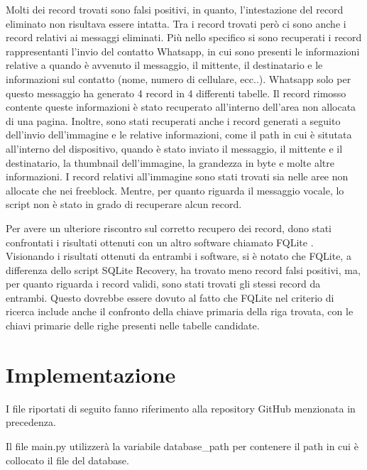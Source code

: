 Molti dei record trovati sono falsi positivi, in quanto, l'intestazione del record eliminato non risultava essere intatta. Tra i record trovati però ci sono anche i record relativi ai messaggi eliminati.
Più nello specifico si sono recuperati i record rappresentanti l'invio del contatto Whatsapp, in cui sono presenti le informazioni relative a quando è avvenuto il messaggio, il mittente, il destinatario e le informazioni sul contatto (nome, numero di cellulare, ecc..).
Whatsapp solo per questo messaggio ha generato 4 record in 4 differenti tabelle.
Il record rimosso contente queste informazioni è stato recuperato all'interno dell'area non allocata di una pagina.
Inoltre, sono stati recuperati anche i record generati a seguito dell'invio dell'immagine e le relative informazioni, come il path in cui è situtata all'interno del dispositivo, quando è stato inviato il messaggio, il mittente e il destinatario, la thumbnail dell'immagine, la grandezza in byte e molte altre informazioni.
I record relativi all'immagine sono stati trovati sia nelle aree non allocate che nei freeblock.
Mentre, per quanto riguarda il messaggio vocale, lo script non è stato in grado di recuperare alcun record.

Per avere un ulteriore riscontro sul corretto recupero dei record, dono stati confrontati i risultati ottenuti con un altro software chiamato FQLite \cite{fqlite}.
Visionando i risultati ottenuti da entrambi i software, si è notato che FQLite, a differenza dello script SQLite Recovery, ha trovato meno record falsi positivi, ma, per quanto riguarda i record validi, sono stati trovati gli stessi record da entrambi.
Questo dovrebbe essere dovuto al fatto che FQLite nel criterio di ricerca include anche il confronto della chiave primaria della riga trovata, con le chiavi primarie delle righe presenti nelle tabelle candidate.

\section{Implementazione}
I file riportati di seguito fanno riferimento alla repository GitHub menzionata in precedenza.

\medskip

Il file main.py utilizzerà la variabile database\string_path per contenere il path in cui è collocato il file del database.

\medskip

